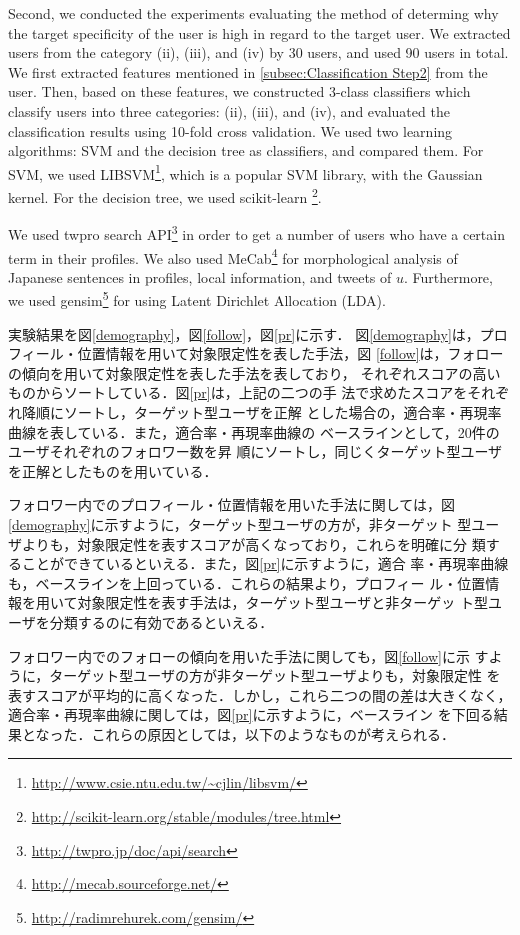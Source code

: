 Second, we conducted the experiments evaluating the method of determing
why the target specificity of the user is high in regard to the target
user.  We extracted users from the category (ii), (iii), and (iv) by 30
users, and used 90 users in total.  We first extracted features
mentioned in \ref{subsec:Classification Step2} from the user.  Then,
based on these features, we constructed 3-class classifiers which
classify users into three categories: (ii), (iii), and (iv), and
evaluated the classification results using 10-fold cross validation.  We
used two learning algorithms: SVM and the decision tree as classifiers,
and compared them.  For SVM, we used
LIBSVM\footnote{\url{http://www.csie.ntu.edu.tw/~cjlin/libsvm/}}, which
is a popular SVM library, with the Gaussian kernel.  For the decision
tree, we used scikit-learn
\footnote{\url{http://scikit-learn.org/stable/modules/tree.html}}.

We used twpro search API\footnote{\url{http://twpro.jp/doc/api/search}}
in order to get a number of users who have a certain term in their
profiles.  We also used
MeCab\footnote{\url{http://mecab.sourceforge.net/}} for morphological
analysis of Japanese sentences in profiles, local information, and
tweets of $u$.  Furthermore, we used
gensim\footnote{\url{http://radimrehurek.com/gensim/}} for using Latent
Dirichlet Allocation (LDA).

実験結果を図\ref{demography}，図\ref{follow}，図\ref{pr}に示す．
図\ref{demography}は，プロフィール・位置情報を用いて対象限定性を表した手法，図
\ref{follow}は，フォローの傾向を用いて対象限定性を表した手法を表しており，
それぞれスコアの高いものからソートしている．図\ref{pr}は，上記の二つの手
法で求めたスコアをそれぞれ降順にソートし，ターゲット型ユーザを正解
とした場合の，適合率・再現率曲線を表している．また，適合率・再現率曲線の
ベースラインとして，20件のユーザそれぞれのフォロワー数を昇
順にソートし，同じくターゲット型ユーザを正解としたものを用いている．

フォロワー内でのプロフィール・位置情報を用いた手法に関しては，図
\ref{demography}に示すように，ターゲット型ユーザの方が，非ターゲット
型ユーザよりも，対象限定性を表すスコアが高くなっており，これらを明確に分
類することができているといえる．また，図\ref{pr}に示すように，適合
率・再現率曲線も，ベースラインを上回っている．これらの結果より，プロフィー
ル・位置情報を用いて対象限定性を表す手法は，ターゲット型ユーザと非ターゲッ
ト型ユーザを分類するのに有効であるといえる．

フォロワー内でのフォローの傾向を用いた手法に関しても，図\ref{follow}に示
すように，ターゲット型ユーザの方が非ターゲット型ユーザよりも，対象限定性
を表すスコアが平均的に高くなった．しかし，これら二つの間の差は大きくなく，
適合率・再現率曲線に関しては，図\ref{pr}に示すように，ベースライン
を下回る結果となった．これらの原因としては，以下のようなものが考えられる．
\vspace{1ex}


